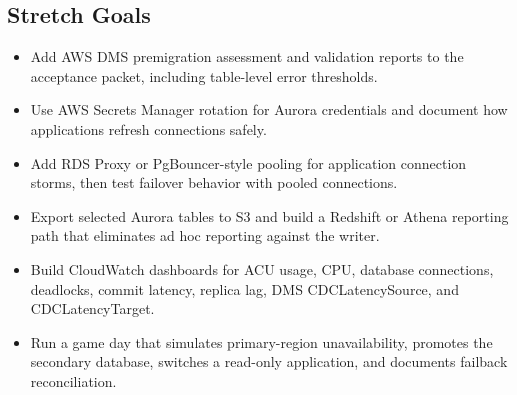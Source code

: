 \subsection*{Stretch Goals}
\begin{itemize}
    \item Add AWS DMS premigration assessment and validation reports to the acceptance packet, including table-level error thresholds.
    \item Use AWS Secrets Manager rotation for Aurora credentials and document how applications refresh connections safely.
    \item Add RDS Proxy or PgBouncer-style pooling for application connection storms, then test failover behavior with pooled connections.
    \item Export selected Aurora tables to S3 and build a Redshift or Athena reporting path that eliminates ad hoc reporting against the writer.
    \item Build CloudWatch dashboards for ACU usage, CPU, database connections, deadlocks, commit latency, replica lag, DMS CDCLatencySource, and CDCLatencyTarget.
    \item Run a game day that simulates primary-region unavailability, promotes the secondary database, switches a read-only application, and documents failback reconciliation.
\end{itemize}
